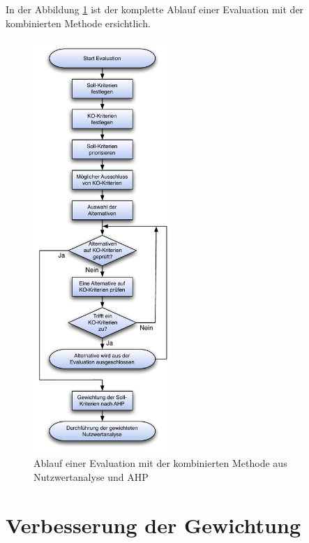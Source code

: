   In der Abbildung \ref{img:ablaufEvaluation} ist der komplette Ablauf einer
  Evaluation mit der kombinierten Methode ersichtlich.
    
  \begin{figure}[ht]
    \begin{center}
      \includegraphics[width=0.47\textwidth]{./image/ablaufEvaluation.pdf}
      \caption{Ablauf einer Evaluation mit der kombinierten Methode aus
      Nutzwertanalyse und \ac{AHP}}
      \label{img:ablaufEvaluation}
    \end{center}
  \end{figure}
  
  \section{Verbesserung der 
  Gewichtung}\label{subsection:VerbesserungDerGewichtung}
  
